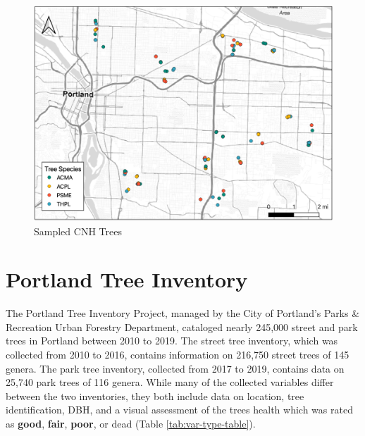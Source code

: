 \documentclass[12pt,twoside]{reedthesis}
\begin{document}
\begin{figure}

{\centering \includegraphics[width=1\linewidth]{figure/cnh_trees} 

}

\caption{Sampled CNH Trees}\label{fig:cnh-trees}
\end{figure}
\hypertarget{portland-tree-inventory}{%
\section{Portland Tree Inventory}\label{portland-tree-inventory}}

The Portland Tree Inventory Project, managed by the City of Portland's
Parks \& Recreation Urban Forestry Department, cataloged nearly 245,000
street and park trees in Portland between 2010 to 2019. The street tree
inventory, which was collected from 2010 to 2016, contains information
on 216,750 street trees of 145 genera. The park tree inventory,
collected from 2017 to 2019, contains data on 25,740 park trees of 116
genera. While many of the collected variables differ between the two
inventories, they both include data on location, tree identification,
DBH, and a visual assessment of the trees health which was rated as
\textbf{good}, \textbf{fair}, \textbf{poor}, or dead (Table \ref{tab:var-type-table}).
\end{document}
